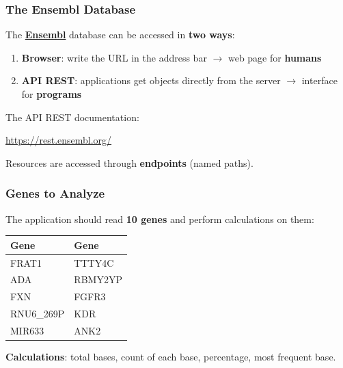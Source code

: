 \documentclass[xcolor=table]{beamer}
\begin{document}
\begin{frame}
\frametitle{The Ensembl Database}

The \href{http://www.ensembl.org/index.html}{\textbf{Ensembl}} database can be accessed in \textbf{two ways}:

\vspace{0.3cm}

\begin{enumerate}
\item \textbf{Browser}: write the URL in the address bar $\rightarrow$ web page for \textbf{humans}
\vspace{0.2cm}
\item \textbf{API REST}: applications get objects directly from the server $\rightarrow$ interface for \textbf{programs}
\end{enumerate}

\vspace{0.3cm}

The API REST documentation:
\begin{center}
\url{https://rest.ensembl.org/}
\end{center}

\vspace{0.2cm}

Resources are accessed through \textbf{endpoints} (named paths).

\end{frame}

\begin{frame}
\frametitle{Genes to Analyze}

The application should read \textbf{10 genes} and perform calculations on them:

\vspace{0.3cm}

\begingroup\small
\begin{center}
\begin{tabular}{|l|l|}
\hline
\textbf{Gene} & \textbf{Gene} \\
\hline
FRAT1 & TTTY4C \\
\hline
ADA & RBMY2YP \\
\hline
FXN & FGFR3 \\
\hline
RNU6\_269P & KDR \\
\hline
MIR633 & ANK2 \\
\hline
\end{tabular}
\end{center}
\endgroup

\vspace{0.3cm}

\textbf{Calculations}: total bases, count of each base, percentage, most frequent base.

\end{frame}
\end{document}
